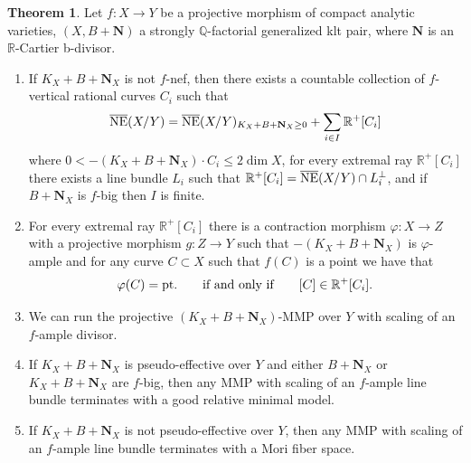 \documentclass[11pt]{amsart}
\numberwithin{equation}{section}
\def\bbeta{\boldsymbol{\beta}}
\def\dim{\operatorname{dim}}
\newcommand\Q{{\mathbb{Q}}}
\newcommand\R{{\mathbb{R}}}
\theoremstyle{definition}
\theoremstyle{definition}
\newtheorem{theorem}{Theorem}[section]
\theoremstyle{definition}
\begin{document}
\begin{theorem}\label{t-projcone} Let $f:X\to Y$ be a projective morphism of compact analytic varieties, $(X,B+\mathbf N)$ a strongly $\Q$-factorial generalized klt pair, where $\mathbf N$ is an $\R$-Cartier b-divisor.
\begin{enumerate}\item If $K_X+B+\mathbf N_X$ is not $f$-nef, then there exists a countable collection of $f$-vertical rational curves $C_i$ such that 
\[\overline{\rm NE}(X/Y)=\overline{\rm NE}(X/Y)_{K_X+B+\mathbf N_X\geq 0}+\sum _{i\in I}\R ^+[C_i]\] where $0<-(K_X+B+\mathbf N_X)\cdot C_i\leq 2\dim X$, for every extremal ray $\R ^+[C_i]$ there exists a line bundle $L_i$ such that $\R ^+[C_i]=\overline{\rm NE}(X/Y)\cap L_i^\perp$, and if $B+\mathbf N_X$ is $f$-big then $I$ is finite.
\item For every extremal ray $\R ^+[C_i]$ there is a contraction morphism $\varphi :X\to Z$ with a projective morphism $g:Z\to Y$ such that $-(K_X + B+\mathbf N_X)$ is $\varphi$-ample
and for any curve $C \subset  X$ such that $f (C)$ is a point we have that
\[\varphi (C)={\rm pt.}\qquad {\text{if and only if}}\qquad [C]\in \R^+[C_i].\]  
\item We can run the projective $(K_X+B+\mathbf N_X)$-MMP over $Y$ with scaling of an $f$-ample divisor.
\item If $K_X+B+\mathbf N_X$ is pseudo-effective over $Y$ and either $B+\mathbf N_X$ or $K_X+B+\mathbf N_X$ are $f$-big, then any MMP with scaling of an $f$-ample line bundle terminates with a good relative minimal model.
\item If $K_X+B+\mathbf N_X$ is not pseudo-effective over $Y$, then any MMP with scaling of an $f$-ample line bundle terminates with a Mori fiber space.
\end{enumerate}
\end{theorem}
\end{document}
